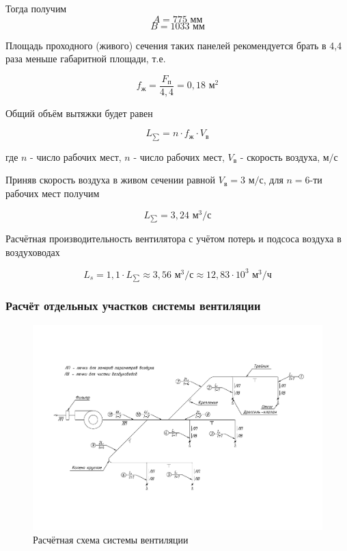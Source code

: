 Тогда получим
$$
    A = 775 \text{ мм}
$$
$$
    B = 1033 \text{ мм}
$$


Площадь проходного (живого) сечения таких панелей рекомендуется брать в 4,4
раза меньше габаритной площади, т.е.

\begin{equation}
\label{alive_section_are}
    f_\text{ж} = \frac{F_\text{п}}{4,4} = 0,18 \text{ м}^2
\end{equation}

Общий объём вытяжки будет равен

\begin{equation}
\label{overall_sucktion_volume}
    L_{\sum} = n \cdot f_\text{ж} \cdot V_\text{в}
\end{equation}

где $n$ - число рабочих мест,
$n$ - число рабочих мест,
$V_\text{в}$ - скорость воздуха, $\text{м/с}$

Приняв скорость воздуха в живом сечении равной $V_\text{в} = 3 \text{ м/с}$,
для $n = 6$-ти рабочих мест получим

$$
    L_{\sum} = 3,24 \text{ м}^3 / \text{с}
$$

Расчётная производительность вентилятора с учётом потерь и подсоса воздуха
в воздуховодах

\begin{equation}
\label{fan_productivity}
    L_s = 1,1 \cdot L_{\sum}
        \approx 3,56 \text{ м}^3 / \text{с}
        \approx 12,83 \cdot 10^3 \text{ м}^3 / \text{ч}
\end{equation}

\subsubsection{Расчёт отдельных участков системы вентиляции}

\begin{figure}[ht]
    \centering
    \includegraphics[width=\textwidth, keepaspectratio, clip=true, trim=0mm 35mm 0mm 40mm]
                    {./src/ecology/pictures/vent_system_arrangement}
    \caption{Расчётная схема системы вентиляции}
    \label{pic_vent_system_arrangement}
\end{figure}

